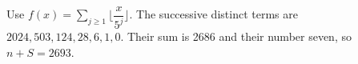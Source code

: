 Use $f(x)=\sum_{j\ge1}\lfloor \dfrac{x}{5^j}\rfloor$. The successive distinct terms are $2024,503,124,28,6,1,0$. Their sum is 2686 and their number seven, so $n+S=\boxed{2693}$.
